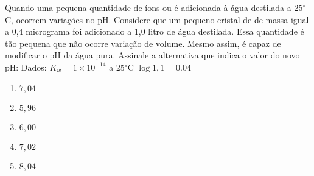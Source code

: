 Quando uma pequena quantidade de íons  ou  é adicionada à água destilada a 25$^\circ$C, ocorrem variações no pH. Considere que um pequeno cristal de  de massa igual a 0,4 micrograma foi adicionado a 1,0 litro de água destilada. Essa quantidade é tão pequena que não ocorre variação de volume. Mesmo assim, é capaz de modificar o pH da água pura. Assinale a alternativa que indica o valor do novo pH: 
Dados: $K_w= 1 \times 10^{-14}$ a 25$^\circ$C 
$\log 1,1 = 0.04$

\begin{enumerate}[label = (\alph*)]	
	\item $7,04$
	\item $5,96$
	\item $6,00$
	\item $7,02$
	\item $8,04$
\end{enumerate}
